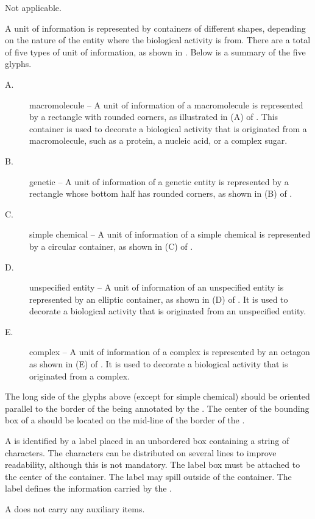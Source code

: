 \begin{glyphDescription}

\glyphSboTerm Not applicable.

\glyphContainer A unit of information is represented by containers of different shapes, depending on the nature of the entity where the biological activity is from. There are a total of five types of unit of information, as shown in .   Below is a summary of the five glyphs.

\begin{description}
\item[A.] macromolecule -- A unit of information of a macromolecule is represented by a rectangle with rounded corners, as illustrated in (A) of .  This container is used to decorate a biological activity that is originated from a macromolecule, such as a protein, a nucleic acid, or a complex sugar.

\item[B.] genetic -- A unit of information of a genetic entity is represented by a rectangle whose bottom half has rounded corners, as shown in (B) of  .

\item[C.] simple chemical -- A unit of information of a simple chemical is represented by a circular container, as shown in (C) of .

\item[D.] unspecified entity -- A unit of information of an unspecified entity is represented by an elliptic container, as shown in (D) of .  It is used to decorate a biological activity that is originated from an unspecified entity.

\item[E.] complex -- A unit of information of a complex is represented by an octagon as shown in (E) of .  It is used to decorate a biological activity that is originated from a complex.
\end{description}

The long side of the glyphs above (except for simple chemical) should be oriented parallel to the border of the  being annotated by the . The center of the bounding box of a  should be located on the mid-line of the border of the .

\glyphLabel A  is identified by a label placed in an unbordered box containing a string of characters. The characters can be distributed on several lines to improve readability, although this is not mandatory.  The label box must be attached to the center of the container. The label may spill outside of the container.  The label defines the information carried by the .

\glyphAux A  does not carry any auxiliary items.

\end{glyphDescription}

